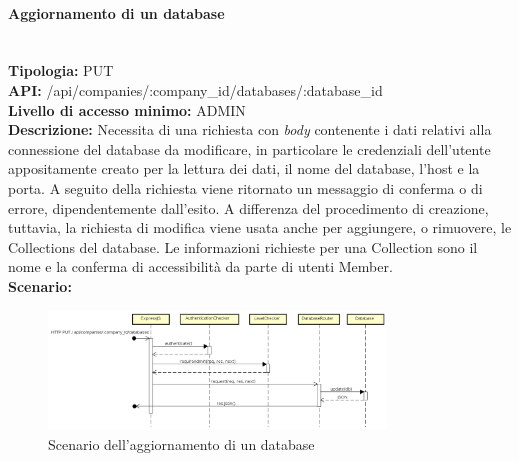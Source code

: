 \paragraph{Aggiornamento di un database}\mbox{}\\
\textbf{Tipologia:} PUT \\
\textbf{API:} /api/companies/:company\_id/databases/:database\_id \\
\textbf{Livello di accesso minimo:} ADMIN \\
\textbf{Descrizione:} Necessita di una richiesta con \textit{body} contenente i dati relativi alla connessione del database da modificare, in particolare le credenziali dell'utente appositamente creato per la lettura dei dati, il nome del database, l'host e la porta. A seguito della richiesta viene ritornato un messaggio di conferma o di errore, dipendentemente dall'esito. A differenza del procedimento di creazione, tuttavia, la richiesta di modifica viene usata anche per aggiungere, o rimuovere, le Collections del database. Le informazioni richieste per una Collection sono il nome e la conferma di accessibilità da parte di utenti Member. \\
\textbf{Scenario:}
\begin{figure}[H]
\centering
\includegraphics[width=0.8\textwidth]{res/sections/backend/sequence/(PUT)database.png}
\caption{Scenario dell'aggiornamento di un database}
\end{figure}

\newpage
